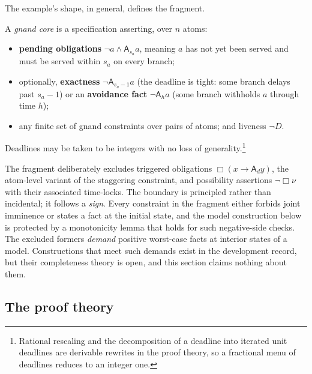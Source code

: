 The example's shape, in general, defines the fragment.

\begin{definition}
\label{def:gnand-core}
A \emph{gnand core} is a specification asserting, over $n$ atoms:
\begin{itemize}
\item \textbf{pending obligations} $\neg a \wedge \mathsf{A}_{s_a}a$,
  meaning $a$ has not yet been served and must be served within $s_a$
  on every branch;
\item optionally, \textbf{exactness} $\neg\mathsf{A}_{s_a-1}a$ (the
  deadline is tight: some branch delays past $s_a - 1$) or an
  \textbf{avoidance fact} $\neg\mathsf{A}_h a$ (some branch withholds
  $a$ through time $h$);
\item any finite set of gnand constraints over pairs of atoms; and
  liveness $\neg D$.
\end{itemize}
Deadlines may be taken to be integers with no loss of
generality.\footnote{Rational rescaling and the decomposition of a
deadline into iterated unit deadlines are derivable rewrites in the
proof theory, so a fractional menu of deadlines reduces to an
integer one.}
\end{definition}

The fragment deliberately excludes triggered obligations
$\Box(x \to \mathsf{A}_d y)$, the atom-level variant of the
staggering constraint, and possibility assertions $\neg\Box\nu$ with
their associated time-locks. The boundary is principled rather than
incidental; it follows a \emph{sign}. Every constraint in the
fragment either forbids joint imminence or states a fact at the
initial state, and the model construction below is protected by a
monotonicity lemma that holds for such negative-side checks.
The excluded formers \emph{demand} positive worst-case facts at
interior states of a model. Constructions that meet such demands
exist in the development record, but their completeness theory is
open, and this section claims nothing about them.

\subsection{The proof theory}
\label{sec:gnand-proof-theory}

